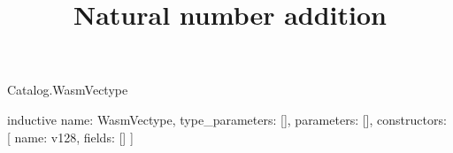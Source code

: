 \begin{lexlean}{Catalog.WasmVectype}
\title{Natural number addition}
\begin{semanticmodule}
inductive{
  name: WasmVectype,
  type_parameters: [],
  parameters: [],
  constructors: [
    {name: v128, fields: []}
  ]
}
\end{semanticmodule}
\end{lexlean}
